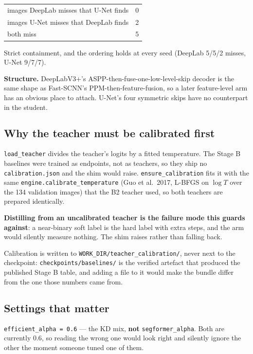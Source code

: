 \documentclass[11pt]{article}
\begin{document}
\begin{center}
\begin{tabular}{ln}
\toprule
images DeepLab misses that U-Net finds & 0 \\
images U-Net misses that DeepLab finds & 2 \\
both miss & 5 \\
\bottomrule
\end{tabular}
\end{center}

Strict containment, and the ordering holds at every seed (DeepLab 5/5/2 misses,
U-Net 9/7/7).

\textbf{Structure.} DeepLabV3+'s ASPP-then-fuse-one-low-level-skip decoder is the
same shape as Fast-SCNN's PPM-then-feature-fusion, so a later feature-level arm
has an obvious place to attach. U-Net's four symmetric skips have no counterpart
in the student.

\subsection{Why the teacher must be calibrated first}

\texttt{load\_teacher} divides the teacher's logits by a fitted temperature. The
Stage B baselines were trained as endpoints, not as teachers, so they ship no
\texttt{calibration.json} and the shim would raise.
\texttt{ensure\_calibration} fits it with the same
\texttt{engine.calibrate\_temperature} (Guo et al.\ 2017, L-BFGS on $\log T$ over
the 134 validation images) that the B2 teacher used, so both teachers are
prepared identically.

\textbf{Distilling from an uncalibrated teacher is the failure mode this guards
against}: a near-binary soft label is the hard label with extra steps, and the arm
would silently measure nothing. The shim raises rather than falling back.

Calibration is written to
\texttt{WORK\_DIR/teacher\_calibration/}, never next to the checkpoint:
\texttt{checkpoints/baselines/} is the verified artefact that produced the
published Stage B table, and adding a file to it would make the bundle differ from
the one those numbers came from.

\subsection{Settings that matter}

\texttt{efficient\_alpha = 0.6} --- the KD mix, \textbf{not}
\texttt{segformer\_alpha}. Both are currently 0.6, so reading the wrong one would
look right and silently ignore the other the moment someone tuned one of them.
\end{document}
